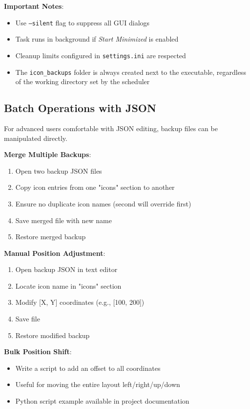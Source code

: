 \documentclass[a4paper,11pt]{article}
\begin{document}
\textbf{Important Notes}:
\begin{itemize}
  \item Use \texttt{--silent} flag to suppress all GUI dialogs
  \item Task runs in background if \textit{Start Minimized} is enabled
  \item Cleanup limits configured in \texttt{settings.ini} are respected
  \item The \texttt{icon\_backups} folder is always created next to the
    executable, regardless of the working directory set by the scheduler
\end{itemize}

\subsection{Batch Operations with JSON}

For advanced users comfortable with JSON editing, backup files can be
manipulated directly.

\textbf{Merge Multiple Backups}:
\begin{enumerate}
  \item Open two backup JSON files
  \item Copy icon entries from one "icons" section to another
  \item Ensure no duplicate icon names (second will override first)
  \item Save merged file with new name
  \item Restore merged backup
\end{enumerate}

\textbf{Manual Position Adjustment}:
\begin{enumerate}
  \item Open backup JSON in text editor
  \item Locate icon name in "icons" section
  \item Modify [X, Y] coordinates (e.g., [100, 200])
  \item Save file
  \item Restore modified backup
\end{enumerate}

\textbf{Bulk Position Shift}:
\begin{itemize}
  \item Write a script to add an offset to all coordinates
  \item Useful for moving the entire layout left/right/up/down
  \item Python script example available in project documentation
\end{itemize}
\end{document}
